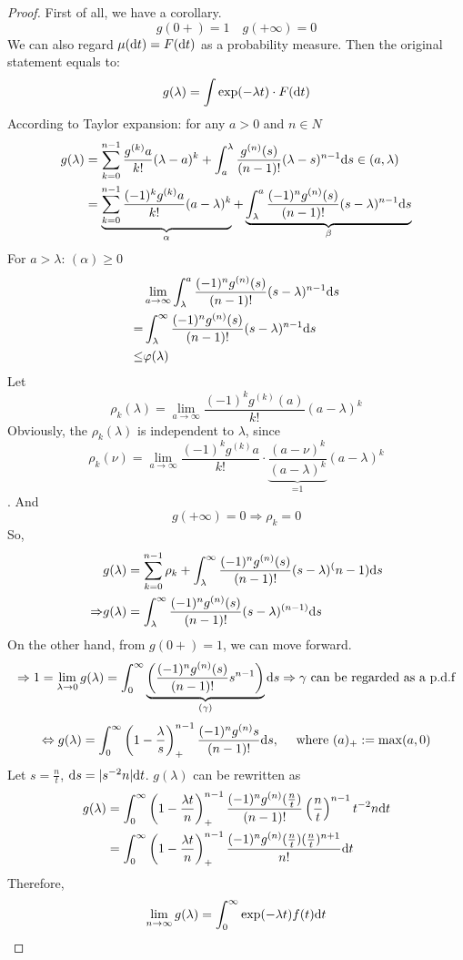 	\begin{proof}
		First of all, we have a corollary.
		$$g(0+) = 1\quad g(+\infty)=0$$
		We can also regard $\mu(\mathrm{d} t)=F(\mathrm{d} t)$ as a probability measure.
		Then the original statement equals to:
		$$g(\lambda) = \int\exp(-\lambda t)\cdot F(\mathrm{d} t)$$
		According to Taylor expansion: for any $a>0$ and $n\in N$
		\begin{align*}
			g(\lambda) &= \sum_{k=0}^{n-1}\frac{g^{(k)}a}{k!}(\lambda -a)^k + \int_a^\lambda \frac{g^{(n)}(s)}{(n-1)!}(\lambda-s)^{n-1}\mathrm{d} s\in (a,\lambda)\\
			& = \underbrace{\sum_{k=0}^{n-1}\frac{(-1)^k g^{(k)}a}{k!}(a - \lambda)^k}_{\alpha} + \underbrace{\int^a_\lambda \frac{(-1)^ng^{(n)}(s)}{(n-1)!}(s-\lambda)^{n-1}\mathrm{d} s}_{\beta}
		\end{align*}
		For $a>\lambda$: $(\alpha)\geq 0$
		\begin{align*}
			&\lim_{a\to \infty}\int_\lambda^a \frac{(-1)^ng^{(n)}(s)}{(n-1)!}(s-\lambda)^{n-1}\mathrm{d} s\\
			= & \int_\lambda^\infty \frac{(-1)^ng^{(n)}(s)}{(n-1)!}(s-\lambda)^{n-1}\mathrm{d} s\\
			\leq & \varphi (\lambda)
		\end{align*}
		Let $$\rho_k(\lambda)=\lim\limits_{a\to\infty}\frac{(-1)^kg^{(k)}(a)}{k!}(a-\lambda)^k$$
		Obviously, the $\rho_k(\lambda)$ is independent to $\lambda$, since 
		$$\rho_k(\nu) =\lim\limits_{a\to \infty} \frac{(-1)^kg^(k)a}{k!}\cdot\underbrace{\frac{(a-\nu)^k}{(a-\lambda)^k}}_{\text{=1}}(a-\lambda)^k$$.
		And
		$$g(+\infty)=0 \Rightarrow\rho_k=0$$
		So, 
		\begin{align*}
			& g(\lambda) = \sum_{k=0}^{n-1}\rho_k + \int_\lambda^\infty \frac{(-1)^ng^{(n)}(s)}{(n-1)!}(s-\lambda)^(n-1) \mathrm{d} s\\
			\Rightarrow & g(\lambda)=\int_\lambda^\infty \frac{(-1)^ng^{(n)}(s)}{(n-1)!}(s-\lambda)^{(n-1)}\mathrm{d} s
		\end{align*}
		On the other hand, from $g(0+)=1$, we can move forward.
		$$\Rightarrow 1 = \lim_{\lambda\to 0}g(\lambda)=\int_0^\infty \underbrace{\left(\frac{(-1)^ng^{(n)}(s)}{(n-1)!}s^{n-1}\right)}_{(\gamma)} \mathrm{d} s\Rightarrow\gamma \text{ can be regarded as a p.d.f}$$ 
		$$\Leftrightarrow g(\lambda) = \int_0^\infty \left(1-\frac{\lambda}{s}\right)_+^{n-1}\frac{(-1)^ng^{(n)}s}{(n-1)!}\mathrm{d} s, \quad \text{ where } (a)_+ := \max(a,0)$$
		Let $s=\frac{n}{t}$, $\mathrm{d} s = |s^{-2}n|\mathrm{d} t$. $g(\lambda)$ can be rewritten as 
		\begin{align*}
			g(\lambda)& = \int_0^\infty \left(1-\frac{\lambda t}{n}\right)^{n-1}_+ \frac{(-1)^ng^{(n)}(\frac{n}{t})}{(n-1)!}\left(\frac{n}{t}\right)^{n-1} t^{-2} n \mathrm{d} t\\
			& = \int_0^\infty \left(1-\frac{\lambda t}{n}\right)^{n-1}_+ \frac{(-1)^n g^{(n)}(\frac{n}{t})(\frac{n}{t})^{n+1}}{n!} \mathrm{d} t
		\end{align*}
		Therefore,
		$$\lim_{n\to\infty}g(\lambda)=\int_0^\infty \exp(-\lambda t)f(t) \mathrm{d} t$$
	\end{proof}

